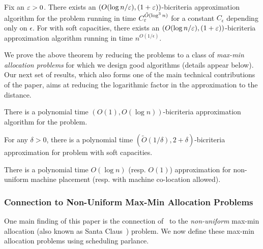 \begin{theorem}\label{fthm:1}
	Fix an $\varepsilon > 0$. There exists an $(O(\log n/\varepsilon), (1+\varepsilon))$-bicriteria approximation algorithm for the \mckc problem running in time $C_\varepsilon^{\tilde{O}(\log^3n)}$ for a constant $C_\epsilon$ depending only on $\epsilon$. For \mckc with soft capacities, there exists an $(O(\log n/\varepsilon), (1+\varepsilon))$-bicriteria approximation algorithm running in time $n^{O(1/\epsilon)}$.
\end{theorem}

We prove the above theorem by reducing the \mckc problems to a class of {\em max-min allocation problems} for which we design good algorithms (details appear below). Our next set of results, which also forms one of the main technical contributions of the paper, aims at reducing the logarithmic factor in the approximation to the distance. %
\begin{theorem}\label{fthm:2}
	There is a polynomial time  $(O(1),O(\log n))$-bicriteria approximation algorithm for the \mckc problem.
\end{theorem}
\begin{theorem}\label{fthm:2a}
	For any $\delta>0$, there is a polynomial time  $(\tilde{O}(1/\delta),2+\delta)$-bicriteria approximation for \mckc problem with soft capacities.
\end{theorem}
\begin{corollary}
There is a polynomial time $O(\log n)$ (resp. $O(1)$) approximation for non-uniform machine placement (resp. with machine co-location allowed).
\end{corollary}


\subsubsection{Connection to Non-Uniform Max-Min Allocation Problems}
One main finding of this paper is the connection of \mckc~to the {\em non-uniform} max-min allocation (also known as Santa Claus~\cite{BansalS06}) problem. %
We now define these max-min allocation problems using  scheduling parlance.

